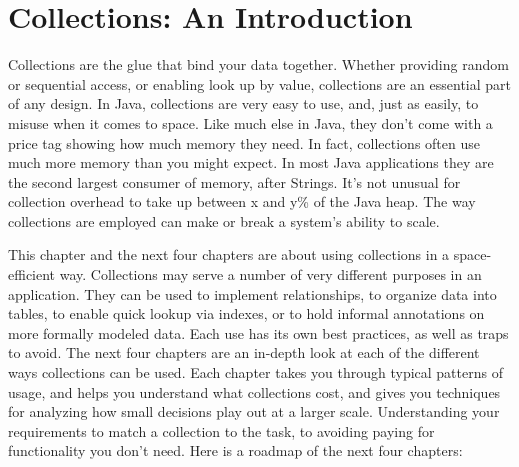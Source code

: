 \chapter{Collections: An Introduction}
\label{chapter:brief-introduction-collections}

Collections are the glue that bind your data together.  Whether 
providing random or sequential access, or enabling
look up by value, collections are an essential part of any
design. In Java, collections are very easy to use, and, just as easily, to misuse when
it comes to space. Like much else in Java, they don't come with a price tag
showing how much memory they need. In fact, collections
often use much more memory than you might expect. In most Java applications they are the second largest consumer of memory, after
Strings. It's not unusual for collection overhead to take up between x and y\%
of the Java heap. The way collections are employed can make
or break a system's ability to scale.


This chapter and the next four chapters are about using
collections in a space-efficient way.  Collections may serve a number of very
different purposes in an application. They can be used to implement
relationships, to organize data into tables, to enable quick lookup via indexes, or
to hold informal annotations on more formally modeled data. Each use
has its own best practices, as well as traps to avoid. The next four chapters are an in-depth
look at each of the different ways collections can be used. Each chapter
takes you through typical patterns of usage, and helps you understand what
collections cost, and gives you techniques for analyzing how
small decisions play out at a larger scale. Understanding your requirements
to match a collection to the task, to avoiding paying for functionality you
don't need.  Here is a roadmap of the next four chapters:

%


